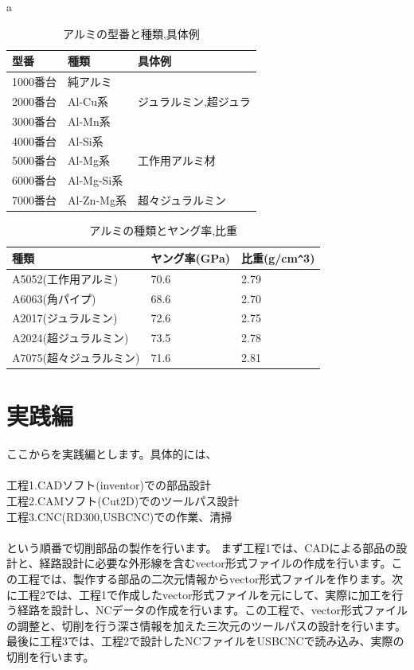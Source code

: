 \documentclass[b5paper, 9pt, twocolumn, titlepage,openany]{jsbook}%
\begin{document}
\begin{table}[htb]
a  \begin{center}
    \begin{tabular}{|l|l|l|} \hline
      型番 & 種類 & 具体例 \\ \hline
      1000番台& 純アルミ &  \\ \hline
      2000番台& Al-Cu系 & ジュラルミン,超ジュラ \\ \hline
      3000番台& Al-Mn系 &  \\ \hline
      4000番台& Al-Si系 &  \\ \hline
      5000番台& Al-Mg系 & 工作用アルミ材 \\ \hline
      6000番台& Al-Mg-Si系 &  \\ \hline
      7000番台& Al-Zn-Mg系 & 超々ジュラルミン \\ \hline
    \end{tabular}
    \caption{アルミの型番と種類,具体例    \label{alminium_num_table}}
  \end{center}
\end{table}

\begin{table}[htb]
  \begin{center}
    \begin{tabular}{|l|l|l|} \hline
      種類 & ヤング率(GPa) & 比重(g/cm\verb|^|3) \\ \hline
      A5052(工作用アルミ)& 70.6 & 2.79 \\ \hline
      A6063(角パイプ)& 68.6 & 2.70 \\ \hline
      A2017(ジュラルミン)& 72.6 & 2.75 \\ \hline
      A2024(超ジュラルミン)& 73.5 & 2.78 \\ \hline
      A7075(超々ジュラルミン)& 71.6 & 2.81 \\ \hline
    \end{tabular}
    \caption{アルミの種類とヤング率,比重    \label{alminium_young_table}}
  \end{center}
\end{table}



\chapter{実践編}
ここからを実践編とします。具体的には、\\\\
  工程1.CADソフト(inventor)での部品設計\\
  工程2.CAMソフト(Cut2D)でのツールパス設計\\
  工程3.CNC(RD300,USBCNC)での作業、清掃\\\\
  という順番で切削部品の製作を行います。
  まず工程1では、CADによる部品の設計と、経路設計に必要な外形線を含むvector形式ファイルの作成を行います。この工程では、製作する部品の二次元情報からvector形式ファイルを作ります。次に工程2では、工程1で作成したvector形式ファイルを元にして、実際に加工を行う経路を設計し、NCデータの作成を行います。この工程で、vector形式ファイルの調整と、切削を行う深さ情報を加えた三次元のツールパスの設計を行います。最後に工程3では、工程2で設計したNCファイルをUSBCNCで読み込み、実際の切削を行います。\\
\end{document}
